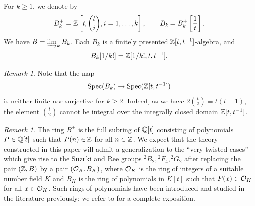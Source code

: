 \documentclass[a4paper, 10pt, oneside, reqno]{amsart}
\theoremstyle{plain}
\theoremstyle{definition}
\theoremstyle{remark}
\newtheorem{rque}[thm]{Remark}
\begin{document}
For $k \geq 1$, we denote  by
$$B^+_k = \mathbb{Z}\left[t,\binom{t}{i}, i = 1, \dots, k\right], \qquad B_k = B^+_k\left[\frac{1}{t}\right]. $$
We have $B=\varinjlim_k B_k$. Each $B_k$ is a finitely presented
$\mathbb{Z}[t,t^{-1}]$-algebra, and
\[
 B_k[1/k!]=\mathbb{Z}[1/k!,t,t^{-1}].
\]
\begin{rque}
Note that the map 
$$\mathrm{Spec}(B_k) \to \mathrm{Spec}(\mathbb{Z}[t,t^{-1}])$$
is neither finite nor surjective for $k\geq 2$. Indeed, as we have $2\binom{t}{2} = t(t-1)$, the element $\binom{t}{2}$ cannot be integral over the integrally closed domain $\mathbb{Z}[t,t^{-1}]$.
\end{rque} 

\begin{rque}
The ring $B^+$ is the full subring of $\mathbb{Q}[t]$ consisting of polynomials $P \in \mathbb{Q}[t]$ such that $P(n) \in \mathbb{Z}$ for all $n \in \mathbb{Z}$. We expect that the theory constructed in this paper will admit a generalization to the ``very twisted cases'' which give rise to the Suzuki and Ree groups ${^2}B_2, {^2}F_4, {^2}G_2$ after replacing the pair $(\mathbb{Z},B)$ by a pair $(\mathcal{O}_K,B_K)$, where $\mathcal{O}_K$ is the ring of integers of a suitable number field $K$ and $B_K$ is the ring of polynomials in $K[t]$ such that $P(x) \in \mathcal{O}_K$ for all $x \in \mathcal{O}_K$. Such rings of polynomials have been introduced and studied in the literature previously; we refer to \cite{CahenChabert} for a complete exposition. 
\end{rque}
\end{document}
